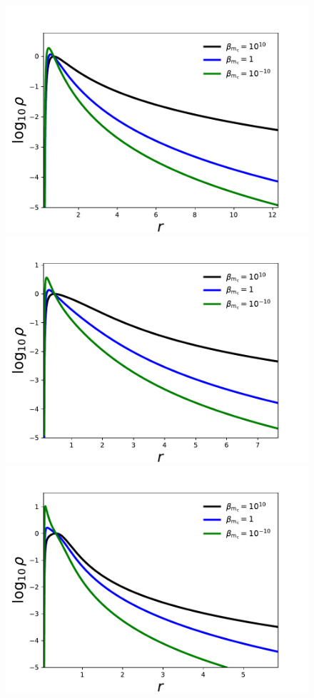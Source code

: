 \documentclass[twocolumn,aps,showpacs,showkeys,prd,superscriptaddress,byrevtex, amsmath]{revtex4-1}
\begin{document}
\begin{figure}
\centering
\includegraphics[scale=0.37]{figures/radial_log_rho_model_I.pdf}
\hspace{-0.6cm}
\includegraphics[scale=0.37]{figures/radial_log_rho_model_IV.pdf}
\hspace{-0.6cm}
\includegraphics[scale=0.37]{figures/radial_log_rho_model_VII.pdf}

\end{figure}
\end{document}
